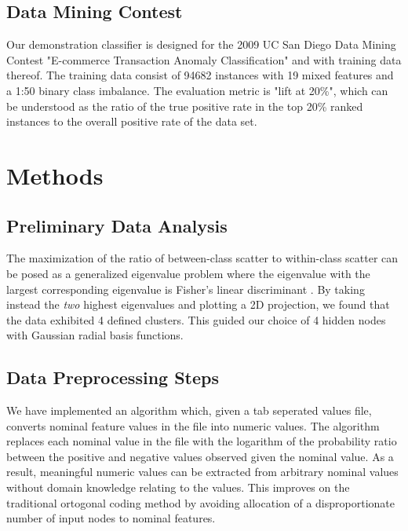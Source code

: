 \documentclass[11pt]{article}       %
\begin{document}
\subsection{Data Mining Contest} \label{contest}
Our demonstration classifier is designed for the 2009 UC San Diego Data Mining Contest "E-commerce Transaction Anomaly Classification" and with training data thereof. The training data consist of 94682 instances with 19 mixed features and a 1:50 binary class imbalance. The evaluation metric is "lift at 20\%", which can be understood as the ratio of the true positive rate in the top 20\% ranked instances to the overall positive rate of the data set.

\section{Methods} \label{algimp}

\subsection{Preliminary Data Analysis} \label{prelim}
The maximization of the ratio of between-class scatter to within-class scatter can be posed as a generalized eigenvalue problem where the eigenvalue with the largest corresponding eigenvalue is Fisher's linear discriminant \cite[\S 3.8.2]{Duda}. By taking instead the \emph{two} highest eigenvalues and plotting a 2D projection, we found that the data exhibited 4 defined clusters. This  guided our choice of 4 hidden nodes with Gaussian radial basis functions.

\subsection{Data Preprocessing Steps} \label{preprocessing}
We have implemented an algorithm which, given a tab seperated values file, converts nominal feature values in the file into numeric values.  The algorithm replaces each nominal value in the file with the logarithm of the probability ratio between the positive and negative values observed given the nominal value.  As a result, meaningful numeric values can be extracted from arbitrary nominal values without domain knowledge relating to the values. This improves on the traditional ortogonal coding method \cite[slide 17]{MLP-NominalCoding} by avoiding allocation of a disproportionate number of input nodes to nominal features.
\end{document}
